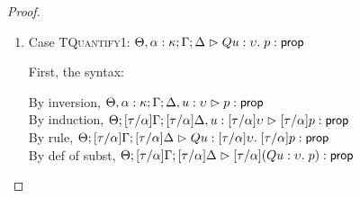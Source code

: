 \begin{proof}
\begin{enumerate}
  For semantics, consider $\interp{\judgeA[\Theta; {[\tau/\alpha]}\Gamma; {[\tau/\alpha]}\Delta]{{[\tau/\alpha]}(p \oplus q)}{\assert}}\;\theta\;\gamma\;\delta$
  \begin{eqnproof}
    {Semantics}
    {Induction}
          {Semantics}
  \end{eqnproof}

\item Case \textsc{TQuantify1}: $\judgeA[\Theta, \alpha:\kappa; \Gamma; \Delta]{Q u:\upsilon.\;p}{\assert}$
  
  First, the syntax:
  \begin{tabbedproof}
    \oo By inversion, $\judgeA[\Theta, \alpha:\kappa; \Gamma; \Delta, u:\upsilon]{p}{\assert}$ \\
    \oo By induction, $\judgeA[\Theta; {[\tau/\alpha]}\Gamma; {[\tau/\alpha]}\Delta, u:{[\tau/\alpha]}\upsilon]{{[\tau/\alpha]}p}{\assert}$ \\
    \oo By rule, $\judgeA[\Theta; {[\tau/\alpha]}\Gamma; {[\tau/\alpha]}\Delta]
                         {Q u:{[\tau/\alpha]}\upsilon.\;{[\tau/\alpha]}p}{\assert}$ \\
    \oo By def of subst, $\judgeA[\Theta; {[\tau/\alpha]}\Gamma; {[\tau/\alpha]}\Delta]
                                 {{[\tau/\alpha]}(Q u:\upsilon.\;p)}{\assert}$ 
  \end{tabbedproof}


\end{enumerate}
\end{proof}
